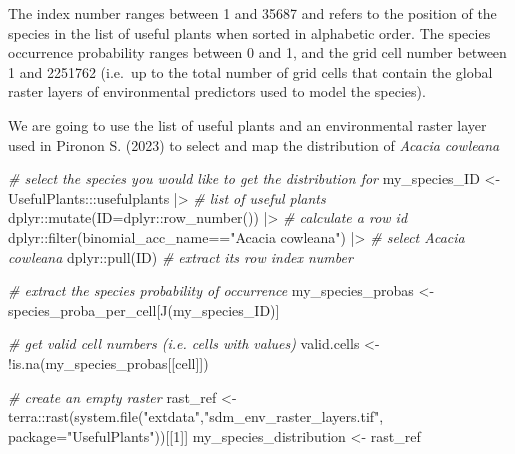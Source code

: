 \documentclass[
]{article}
\newenvironment{Shaded}{\begin{snugshade}}{\end{snugshade}}
\newcommand{\AttributeTok}[1]{\textcolor[rgb]{0.77,0.63,0.00}{#1}}
\newcommand{\CommentTok}[1]{\textcolor[rgb]{0.56,0.35,0.01}{\textit{#1}}}
\newcommand{\DecValTok}[1]{\textcolor[rgb]{0.00,0.00,0.81}{#1}}
\newcommand{\FunctionTok}[1]{\textcolor[rgb]{0.00,0.00,0.00}{#1}}
\newcommand{\NormalTok}[1]{#1}
\newcommand{\OtherTok}[1]{\textcolor[rgb]{0.56,0.35,0.01}{#1}}
\newcommand{\SpecialCharTok}[1]{\textcolor[rgb]{0.00,0.00,0.00}{#1}}
\newcommand{\StringTok}[1]{\textcolor[rgb]{0.31,0.60,0.02}{#1}}
\begin{document}
The index number ranges between 1 and 35687 and refers to the position
of the species in the list of useful plants when sorted in alphabetic
order. The species occurrence probability ranges between 0 and 1, and
the grid cell number between 1 and 2251762 (i.e.~up to the total number
of grid cells that contain the global raster layers of environmental
predictors used to model the species).

We are going to use the list of useful plants and an environmental
raster layer used in Pironon S. (2023) to select and map the
distribution of \emph{Acacia cowleana}

\begin{Shaded}
\begin{Highlighting}[]

\CommentTok{\# select the species you would like to get the distribution for }
\NormalTok{my\_species\_ID  }\OtherTok{\textless{}{-}}\NormalTok{ UsefulPlants}\SpecialCharTok{:::}\NormalTok{usefulplants }\SpecialCharTok{|\textgreater{}} \CommentTok{\# list of useful plants }
\NormalTok{  dplyr}\SpecialCharTok{::}\FunctionTok{mutate}\NormalTok{(}\AttributeTok{ID=}\NormalTok{dplyr}\SpecialCharTok{::}\FunctionTok{row\_number}\NormalTok{()) }\SpecialCharTok{|\textgreater{}} \CommentTok{\# calculate a row id}
\NormalTok{  dplyr}\SpecialCharTok{::}\FunctionTok{filter}\NormalTok{(binomial\_acc\_name}\SpecialCharTok{==}\StringTok{"Acacia cowleana"}\NormalTok{) }\SpecialCharTok{|\textgreater{}}  \CommentTok{\# select Acacia cowleana}
\NormalTok{  dplyr}\SpecialCharTok{::}\FunctionTok{pull}\NormalTok{(ID) }\CommentTok{\# extract its row index number}

\CommentTok{\# extract the species probability of occurrence   }
\NormalTok{my\_species\_probas }\OtherTok{\textless{}{-}}\NormalTok{ species\_proba\_per\_cell[}\FunctionTok{J}\NormalTok{(my\_species\_ID)]}

\CommentTok{\# get valid cell numbers (i.e. cells with values)}
\NormalTok{valid.cells }\OtherTok{\textless{}{-}} \SpecialCharTok{!}\FunctionTok{is.na}\NormalTok{(my\_species\_probas[[}\StringTok{\textquotesingle{}cell\textquotesingle{}}\NormalTok{]])}

\CommentTok{\# create an empty raster }
\NormalTok{rast\_ref }\OtherTok{\textless{}{-}}\NormalTok{ terra}\SpecialCharTok{::}\FunctionTok{rast}\NormalTok{(}\FunctionTok{system.file}\NormalTok{(}\StringTok{"extdata"}\NormalTok{,}\StringTok{"sdm\_env\_raster\_layers.tif"}\NormalTok{,}
                                    \AttributeTok{package=}\StringTok{"UsefulPlants"}\NormalTok{))[[}\DecValTok{1}\NormalTok{]]}
\NormalTok{my\_species\_distribution }\OtherTok{\textless{}{-}}\NormalTok{ rast\_ref}


\end{Highlighting}
\end{Shaded}
\end{document}
